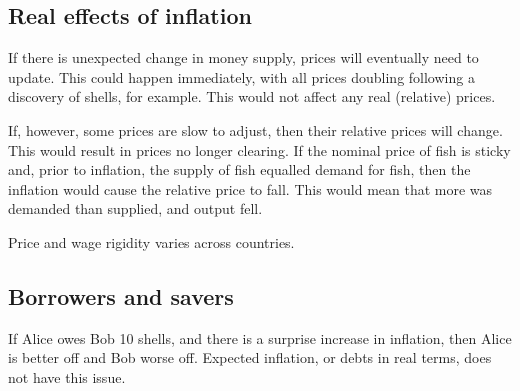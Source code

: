 
\subsection{Real effects of inflation}

If there is unexpected change in money supply, prices will eventually need to update. This could happen immediately, with all prices doubling following a discovery of shells, for example. This would not affect any real (relative) prices.

If, however, some prices are slow to adjust, then their relative prices will change. This would result in prices no longer clearing. If the nominal price of fish is sticky and, prior to inflation, the supply of fish equalled demand for fish, then the inflation would cause the relative price to fall. This would mean that more was demanded than supplied, and output fell.

Price and wage rigidity varies across countries.

\subsection{Borrowers and savers}

If Alice owes Bob 10 shells, and there is a surprise increase in inflation, then Alice is better off and Bob worse off. Expected inflation, or debts in real terms, does not have this issue.

